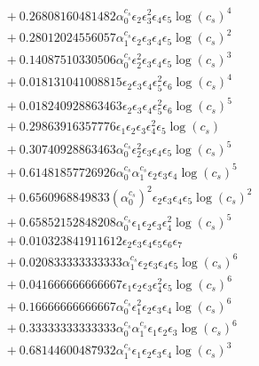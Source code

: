 \documentclass[10pt]{article}
\begin{document}
\begin{align*}
&{}  + 0.26808160481482 \alpha_{0}^{c_s} \epsilon_{2} \epsilon_{3}^{2} \epsilon_{4} \epsilon_{5} \log{\left(c_{s} \right)}^{4} \\
&{}  + 0.28012024556057 \alpha_{1}^{c_s} \epsilon_{2} \epsilon_{3} \epsilon_{4} \epsilon_{5} \log{\left(c_{s} \right)}^{2} \\
&{}  + 0.14087510330506 \alpha_{0}^{c_s} \epsilon_{2}^{2} \epsilon_{3} \epsilon_{4} \epsilon_{5} \log{\left(c_{s} \right)}^{3} \\
&{}  + 0.018131041008815 \epsilon_{2} \epsilon_{3} \epsilon_{4} \epsilon_{5}^{2} \epsilon_{6} \log{\left(c_{s} \right)}^{4} \\
&{}  + 0.018240928863463 \epsilon_{2} \epsilon_{3} \epsilon_{4} \epsilon_{5}^{2} \epsilon_{6} \log{\left(c_{s} \right)}^{5} \\
&{}  + 0.29863916357776 \epsilon_{1} \epsilon_{2} \epsilon_{3} \epsilon_{4}^{2} \epsilon_{5} \log{\left(c_{s} \right)} \\
&{}  + 0.30740928863463 \alpha_{0}^{c_s} \epsilon_{2}^{2} \epsilon_{3} \epsilon_{4} \epsilon_{5} \log{\left(c_{s} \right)}^{5} \\
&{}  + 0.61481857726926 \alpha_{0}^{c_s} \alpha_{1}^{c_s} \epsilon_{2} \epsilon_{3} \epsilon_{4} \log{\left(c_{s} \right)}^{5} \\
&{}  + 0.6560968849833 \left(\alpha_{0}^{c_s}\right)^{2} \epsilon_{2} \epsilon_{3} \epsilon_{4} \epsilon_{5} \log{\left(c_{s} \right)}^{2} \\
&{}  + 0.65852152848208 \alpha_{0}^{c_s} \epsilon_{1} \epsilon_{2} \epsilon_{3} \epsilon_{4}^{2} \log{\left(c_{s} \right)}^{5} \\
&{}  + 0.010323841911612 \epsilon_{2} \epsilon_{3} \epsilon_{4} \epsilon_{5} \epsilon_{6} \epsilon_{7} \\
&{}  + 0.020833333333333 \alpha_{1}^{c_s} \epsilon_{2} \epsilon_{3} \epsilon_{4} \epsilon_{5} \log{\left(c_{s} \right)}^{6} \\
&{}  + 0.041666666666667 \epsilon_{1} \epsilon_{2} \epsilon_{3} \epsilon_{4}^{2} \epsilon_{5} \log{\left(c_{s} \right)}^{6} \\
&{}  + 0.16666666666667 \alpha_{0}^{c_s} \epsilon_{1}^{2} \epsilon_{2} \epsilon_{3} \epsilon_{4} \log{\left(c_{s} \right)}^{6} \\
&{}  + 0.33333333333333 \alpha_{0}^{c_s} \alpha_{1}^{c_s} \epsilon_{1} \epsilon_{2} \epsilon_{3} \log{\left(c_{s} \right)}^{6} \\
&{}  + 0.68144600487932 \alpha_{1}^{c_s} \epsilon_{1} \epsilon_{2} \epsilon_{3} \epsilon_{4} \log{\left(c_{s} \right)}^{3} \\

\end{align*}
\end{document}
